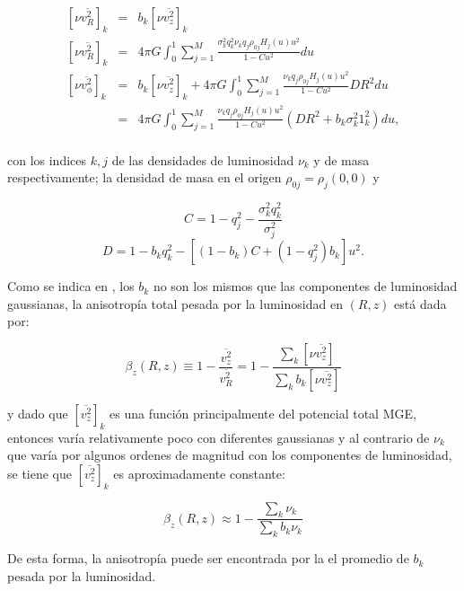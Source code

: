 \begin{eqnarray}
\label{component_bright_vel_1}
\left[\nu \overline{v_R^2} \right]_k &=& b_k \left[\nu \overline{v_z^2} \right]_k \\
\label{component_bright_vel_2}
\left[\nu \overline{v_R^2} \right]_k &=& 4\pi G \int_0^1 \sum_{j=1}^{M} \frac{ \sigma_k^2 q_k^2 \nu_k q_j \rho_{0j} H_j(u) u^2 }{ 1-Cu^2 } du \\
\label{component_bright_vel_3}
\left[ \nu \overline{v_{\phi}^2} \right]_k &=& b_k \left[ \nu \overline{v_z^2} \right]_k + 4\pi G \int_0^1 \sum_{j=1}^{M} \frac{ \nu_k q_j \rho_{0j} H_j(u) u^2 }{ 1-Cu^2 } D R^2 du \\
\label{component_bright_vel_4}
 & = & 4\pi G \int_0^1 \sum_{j=1}^{M} \frac{ \nu_k q_j \rho_{0j} H_j(u) u^2 }{ 1-Cu^2 } (D R^2 + b_k \sigma_k^2 1_k^2) du, \\
\end{eqnarray}

con los indices $k,j$ de las densidades de luminosidad $\nu_k$ y de masa respectivamente; la densidad de masa en el origen $\rho_{0j} = \rho_j(0,0)$ y 

$$ C=1-q_j^2 - \frac{\sigma_k^2 q_k^2 }{ \sigma_j^2 } $$
$$ D = 1-b_kq_k^2 - [(1-b_k)C + (1-q_j^2)b_k ] u^2. $$

Como se indica en \cite{2008MNRAS.390_71C}, los $b_k$ no son los mismos que las componentes de luminosidad gaussianas, la anisotropía total pesada por la luminosidad en $(R, z)$ está dada por:

\begin{equation}
\label{anisotropy_z}
\beta_z(R, z) \equiv 1-\frac{ \overline{v_z^2} }{ \overline{v_R^2} } = 1-\frac{ \sum_k \left[ \nu  \overline{v_z^2} \right]  }{ \sum_k b_k \left[ \nu  \overline{v_z^2} \right] }
\end{equation}

y dado que $[\overline{v_z^2}]_k$ es una función principalmente del potencial total MGE, entonces varía relativamente poco con diferentes gaussianas y al contrario de $\nu_k$ que varía por algunos ordenes de magnitud con los componentes de luminosidad, se tiene que $[\overline{v_z^2}]_k$ es aproximadamente constante:

\begin{equation}
\label{anisotropy_z_approx}
\beta_z(R, z) \approx 1-\frac{ \sum_k \nu_k }{ \sum_k b_k \nu_k }
\end{equation}

De esta forma, la anisotropía puede ser encontrada por la el promedio de $b_k$ pesada por la luminosidad.


